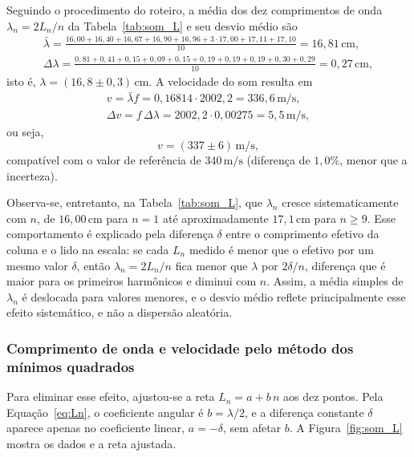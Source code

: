 \documentclass[12pt, a4paper]{article}
\newcommand{\un}[1]{\,\mathrm{#1}}
\begin{document}
Seguindo o procedimento do roteiro, a média dos dez comprimentos de onda $\lambda_n=2L_n/n$ da Tabela~\ref{tab:som_L} e seu desvio médio são
\begin{gather*}
\bar{\lambda}=\frac{16{,}00+16{,}40+16{,}67+16{,}90+16{,}96+3\cdot17{,}00+17{,}11+17{,}10}{10}=16{,}81\un{cm},\\
\Delta\lambda=\frac{0{,}81+0{,}41+0{,}15+0{,}09+0{,}15+0{,}19+0{,}19+0{,}19+0{,}30+0{,}29}{10}=0{,}27\un{cm},
\end{gather*}
isto é, $\lambda=(16{,}8\pm0{,}3)\un{cm}$. A velocidade do som resulta em
\begin{gather*}
v=\bar{\lambda}f=0{,}16814\cdot2002{,}2=336{,}6\un{m/s},\\
\Delta v=f\,\Delta\lambda=2002{,}2\cdot0{,}00275=5{,}5\un{m/s},
\end{gather*}
ou seja,
\[
v=(337\pm6)\un{m/s},
\]
compatível com o valor de referência de $340\un{m/s}$ (diferença de $1{,}0\%$, menor que a incerteza).

Observa-se, entretanto, na Tabela~\ref{tab:som_L}, que $\lambda_n$ cresce sistematicamente com $n$, de $16{,}00\un{cm}$ para $n=1$ até aproximadamente $17{,}1\un{cm}$ para $n\ge9$. Esse comportamento é explicado pela diferença $\delta$ entre o comprimento efetivo da coluna e o lido na escala: se cada $L_n$ medido é menor que o efetivo por um mesmo valor $\delta$, então $\lambda_n=2L_n/n$ fica menor que $\lambda$ por $2\delta/n$, diferença que é maior para os primeiros harmônicos e diminui com $n$. Assim, a média simples de $\lambda_n$ é deslocada para valores menores, e o desvio médio reflete principalmente esse efeito sistemático, e não a dispersão aleatória.

\subsubsection{Comprimento de onda e velocidade pelo método dos mínimos quadrados}

Para eliminar esse efeito, ajustou-se a reta $L_n=a+b\,n$ aos dez pontos. Pela Equação~\eqref{eq:Ln}, o coeficiente angular é $b=\lambda/2$, e a diferença constante $\delta$ aparece apenas no coeficiente linear, $a=-\delta$, sem afetar $b$. A Figura~\ref{fig:som_L} mostra os dados e a reta ajustada.
\end{document}
